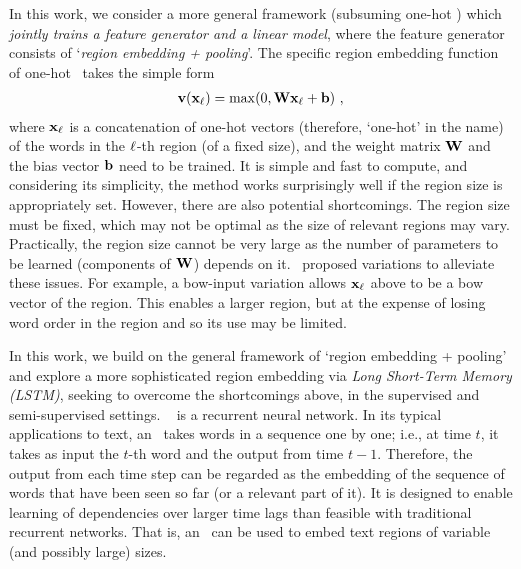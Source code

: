 \documentclass{article}
\begin{document}
In this work, we consider a more general framework (subsuming one-hot \cnn) which 
{\em jointly trains a feature generator and a linear model}, where the 
feature generator consists of `{\em region embedding + pooling}'. 
The specific region embedding function 
of one-hot \cnn\ 
takes the simple form
\newcommand{\cnnAct}[1]{\max(0,#1)}
\begin{align}
\bv(\bx_\iL) = \cnnAct{\Wei \bx_\iL + \bb}~, \label{eq:cnn}
\end{align}
where ${\mathbf x}_\ell$ is a concatenation of one-hot vectors (therefore, `one-hot' in the name) 
of the words in the $\ell$-th region (of a fixed size), 
and the weight matrix ${\mathbf W}$ and the bias vector ${\mathbf b}$ need to be trained.  
It is simple and fast to compute, and considering its simplicity,
the method works surprisingly well if the region size is appropriately set.  
However, there are also potential shortcomings.  
The region size must be fixed, which may not be optimal as the size of 
relevant regions may vary.  Practically, the region size cannot be very large 
as the number of parameters to be learned (components of ${\mathbf W}$) depends on it. 
\JZab\ proposed variations to alleviate these issues.  For example, a bow-input variation allows 
${\mathbf x}_\ell$ above to be a bow vector of the region.  This enables a larger region, but 
at the expense of losing word order in the region and so its use may be limited.  


In this work, we build on the general framework of `region embedding + pooling' 
and explore a more sophisticated region embedding via {\em Long Short-Term Memory (LSTM)}, 
seeking to overcome the shortcomings above, 
in the supervised and semi-supervised settings. 
\lstm\ \cite{HS97} is a recurrent neural network.  In its typical applications to text, 
an \lstm\ takes words in a sequence one by one; i.e., 
at time $t$, it takes as input the $t$-th word and the output from time $t-1$.  
Therefore, the output from each time step can be regarded as the embedding of the sequence of words 
that have been seen so far (or a relevant part of it). 
It is designed to enable learning of dependencies over larger time lags 
than feasible with traditional recurrent networks. 
That is, an \lstm\ can be used to embed text regions of variable (and possibly large) sizes. 
\end{document}
